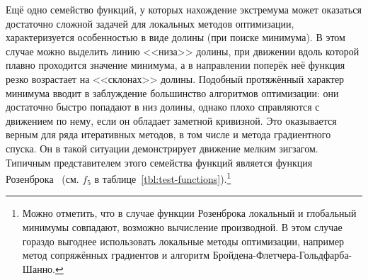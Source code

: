 Ещё одно семейство функций, у которых нахождение экстремума может
оказаться достаточно сложной задачей для локальных методов
оптимизации, характеризуется особенностью в виде долины (при поиске
минимума). В этом случае можно выделить линию <<низа>> долины, при
движении вдоль которой плавно проходится значение минимума, а в
направлении поперёк неё функция резко возрастает на <<склонах>>
долины. Подобный протяжённый характер минимума вводит в заблуждение
большинство алгоритмов оптимизации: они достаточно быстро попадают в
низ долины, однако плохо справляются с движением по нему, если он
обладает заметной кривизной. Это оказывается верным для ряда
итеративных методов, в том числе и метода градиентного спуска. Он в
такой ситуации демонстрирует движение мелким зигзагом. Типичным
представителем этого семейства функций является функция
Розенброка~\cite{Rosenbrock-1960} (см. $f_5$ в
таблице~\ref{tbl:test-functions}).\footnote{Можно отметить, что в
  случае функции Розенброка локальный и глобальный минимумы совпадают,
  возможно вычисление производной. В этом случае гораздо
  выгоднее использовать локальные методы оптимизации, например метод сопряжённых
  градиентов и алгоритм Бройдена-Флетчера-Гольдфарба-Шанно. }
\begingroup %
\renewcommand{\arraystretch}{1.6}%
